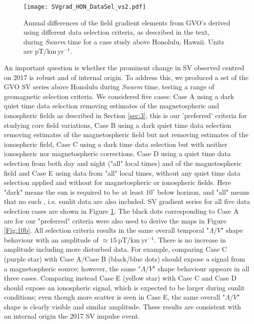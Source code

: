 \documentclass[extra,mreferee]{gji}
\begin{document}
\begin{figure}
\centerline{\texttt{[image: SVgrad\_HON\_DataSel\_vs2.pdf]}}
\caption{Annual differences of the field gradient elements from GVO's derived using different data selection criteria, as described in the text, during {\it Swarm} time for a case study above Honolulu, Hawaii. Units are $\mathrm{pT}/\mathrm{km} \, \mathrm{yr}^{-1}$.}
\label{Fig:11}
\end{figure} 
An important question is whether the prominent change in SV observed centred on 2017 is robust and of internal origin. To address this, we produced a set of the GVO SV series above Honolulu\deleted{,} during {\it Swarm} time, testing a range of geomagnetic selection criteria. We considered five cases: Case A using a dark quiet time data selection removing estimates of the magnetospheric and ionospheric fields as described in Section \ref{sec:3}, this is our 'preferred' criteria for studying core field variations, Case B using a dark quiet time data selection removing estimates of the magnetospheric field but not removing estimates of the ionospheric field, Case C using a dark time data selection but with neither ionospheric nor magnetospheric corrections, Case D using a quiet time data selection from both day and night ("all" local times) and  of the magnetospheric field and Case E using data from "all" local times, without any quiet time data selection applied and without  for magnetospheric or ionospheric fields. Here "dark" means the sun is required to be at least $10^{\circ}$ below horizon, and "all" means that no such , i.e. sunlit data are also included. SV gradient series for all five data selection cases are shown in Figure \ref{Fig:11}. The black dots corresponding to Case A are for our "preferred" criteria were also used to derive the maps in Figure \ref{Fig:10b}. All selection criteria results in the same overall temporal "$\Lambda / V$" shape behaviour with an amplitude of $\approx 15 \: \mathrm{pT/km \: yr^{-1}}$. There is no increase in amplitude  including more disturbed data. For example, comparing Case C (purple star) with Case A/Case B (black/blue dots) should expose a signal from a magnetospheric source; however, the same "$\Lambda / V$" shape behaviour appears in all three cases. Comparing instead Case E (yellow star) with Case C and Case D should expose an ionospheric signal, which is expected to be larger during sunlit conditions; even though more scatter is seen in Case E, the same overall "$\Lambda / V$" shape is clearly visible and  similar amplitude. These results are consistent with an internal origin  the 2017 SV impulse event.
\end{document}

